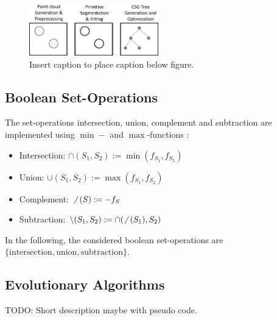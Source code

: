 \begin{figure}[htb]
	\centering
	\includegraphics[width=0.5\textwidth]{figures/Praesentation1.pdf}
	\caption{Insert caption to place caption below figure.}
	\label{fig:spp}
\end{figure}

\subsection{Boolean Set-Operations}
The set-operations intersection, union, complement and subtraction are implemented using $\min-$ and $\max$-functions \cite{ricci197constgeo}: 
\begin{itemize}
	\item Intersection: $\cap(S_1,S_2) := \min(f_{S_1}, f_{S_2})$
	\item Union: $\cup(S_1,S_2) := \max(f_{S_1}, f_{S_2})$
	\item Complement: $\not \enskip(S) := -f_S$
	\item Subtraction: $\setminus(S_1,S_2) := \cap(\not \enskip(S_1), S_2)$%
\end{itemize}
In the following, the considered boolean set-operations are $\{\text{intersection}, \text{union}, \text{subtraction}\}$.
\subsection{Evolutionary Algorithms} 
TODO: Short description maybe with pseudo code.
\\
